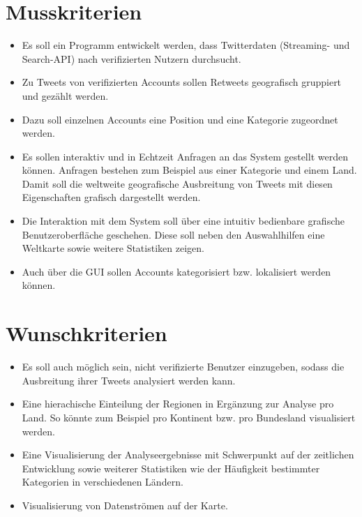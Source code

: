 
\section{Musskriterien}
\begin{itemize}
	\item Es soll ein Programm entwickelt werden, dass Twitterdaten (Streaming- und Search-API) nach verifizierten Nutzern durchsucht.
	\item Zu Tweets von verifizierten Accounts sollen Retweets geografisch gruppiert und gezählt werden.
	\item Dazu soll einzelnen Accounts eine Position und eine Kategorie zugeordnet werden.
	\item Es sollen interaktiv und in Echtzeit Anfragen an das System gestellt werden können. Anfragen bestehen zum Beispiel aus einer Kategorie und einem Land. Damit soll die weltweite geografische Ausbreitung von Tweets mit diesen Eigenschaften grafisch dargestellt werden.
	\item Die Interaktion mit dem System soll über eine intuitiv bedienbare grafische Benutzeroberfläche geschehen. Diese soll neben den Auswahlhilfen eine Weltkarte sowie weitere Statistiken zeigen.
	\item Auch über die GUI sollen Accounts kategorisiert bzw. lokalisiert werden können.
\end{itemize}

\section{Wunschkriterien}
\begin{itemize}
	\item Es soll auch möglich sein, nicht verifizierte Benutzer einzugeben, sodass die Ausbreitung ihrer Tweets analysiert werden kann.
	\item Eine hierachische Einteilung der Regionen in Ergänzung zur Analyse pro Land. So könnte zum Beispiel pro Kontinent bzw. pro Bundesland visualisiert werden.
	\item Eine Visualisierung der Analyseergebnisse mit Schwerpunkt auf der zeitlichen Entwicklung sowie weiterer Statistiken wie der Häufigkeit bestimmter Kategorien in verschiedenen Ländern.
	\item Visualisierung von Datenströmen auf der Karte.
\end{itemize}

